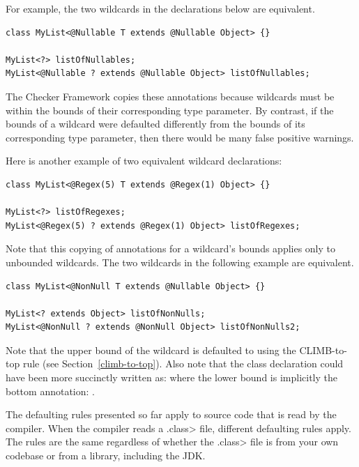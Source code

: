 For example, the two wildcards in
the declarations below are equivalent.

\begin{Verbatim}
class MyList<@Nullable T extends @Nullable Object> {}

MyList<?> listOfNullables;
MyList<@Nullable ? extends @Nullable Object> listOfNullables;
\end{Verbatim}

The Checker Framework copies
these annotations because wildcards must be within the bounds of their
corresponding type parameter.
By contrast, if the bounds of a wildcard
were defaulted differently from the bounds of its corresponding type
parameter, then there would be many false positive
 warnings.

Here is another example of two equivalent wildcard declarations:

\begin{Verbatim}
class MyList<@Regex(5) T extends @Regex(1) Object> {}

MyList<?> listOfRegexes;
MyList<@Regex(5) ? extends @Regex(1) Object> listOfRegexes;
\end{Verbatim}

Note that this copying of annotations for a wildcard's bounds applies only to
unbounded wildcards.  The two wildcards in the
following example are equivalent.

\begin{Verbatim}
class MyList<@NonNull T extends @Nullable Object> {}

MyList<? extends Object> listOfNonNulls;
MyList<@NonNull ? extends @NonNull Object> listOfNonNulls2;
\end{Verbatim}

Note that the upper bound of the wildcard  is defaulted to
 using the CLIMB-to-top rule (see Section~\ref{climb-to-top}).
Also note that the  class declaration could have been more succinctly
written as:  where the lower bound
is implicitly the bottom annotation: .


The defaulting rules presented so far apply to source code that is read by
the compiler.  When the compiler reads a \<.class> file, different
defaulting rules apply.  The rules are the same regardless of whether the
\<.class> file is from your own codebase or from a library, including the
JDK\@.

